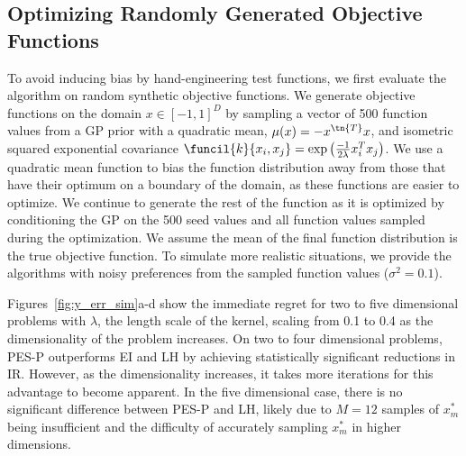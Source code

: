 \subsection{Optimizing Randomly Generated Objective Functions}

To avoid inducing bias by hand-engineering test functions, we first evaluate the
algorithm on random synthetic objective functions. We generate objective
functions on the domain $x \in {[-1, 1]}^D$ by sampling a vector of 500 function
values from a GP prior with a quadratic mean, $\mu(x) = - x^\tn{T} x$, and
isometric squared exponential covariance $\funcil{k}{x_i,x_j} = \exp
\left(\frac{-1}{2 \lambda} x_i^T x_j \right)$. We use a quadratic mean function
to bias the function distribution away from those that have their optimum on a
boundary of the domain, as these functions are easier to optimize. We continue
to generate the rest of the function as it is optimized by conditioning the GP
on the 500 seed values and all function values sampled during the optimization.
We assume the mean of the final function distribution is the true objective
function. To simulate more realistic situations, we provide the algorithms with
noisy preferences from the sampled function values ($\sigma^2 = 0.1$).

Figures~\ref{fig:y_err_sim}a-d show the immediate regret for two to five
dimensional problems with $\lambda$, the length scale of the kernel, scaling
from 0.1 to 0.4 as the dimensionality of the problem increases. On two to four
dimensional problems, PES-P outperforms EI and LH by achieving statistically
significant reductions in IR\@. However, as the dimensionality increases, it
takes more iterations for this advantage to become apparent. In the five
dimensional case, there is no significant difference between PES-P and LH,
likely due to $M=12$ samples of $x_m^*$ being insufficient and the difficulty of
accurately sampling $x_m^*$ in higher dimensions.

